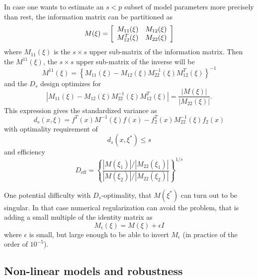 \documentclass[12pt]{iopart}
\begin{document}
In case one wants to estimate an $s < p$ subset of model parameters more precisely than rest, the information matrix can be partitioned as
\begin{equation}
M(\xi) = \left[
  \begin{array}{l l}
    M_{11}(\xi)   & M_{12}(\xi)\\
    M^T_{12}(\xi) & M_{22}(\xi)
  \end{array} \right]
\end{equation}
where $M_{11}(\xi)$ is the $s \times s$ upper sub-matrix of the information matrix. Then the $M^{11}(\xi)$, the $s \times s$ upper sub-matrix of the inverse will be
\begin{equation}
M^{11}(\xi) = \left\{M_{11}(\xi) - M_{12}(\xi)M^{-1}_{22}(\xi)M^T_{12}(\xi)\right\}^{-1}
\end{equation}
and the $D_s$ design optimizes for 
\begin{equation}
|M_{11}(\xi) - M_{12}(\xi)M^{-1}_{22}(\xi)M^T_{12}(\xi)| = \frac{|M(\xi)|}{|M_{22}(\xi)|}.
\end{equation}
This expression gives the standardized variance as
\begin{equation}
d_s(x, \xi) = f^T(x) M^{-1}(\xi)f(x) - f_2^T(x) M_{22}^{-1}(\xi)f_2(x)
\label{eq:dsvar}
\end{equation}
with optimality requirement of
\begin{equation}
d_s(x, \xi^*) \leq s
\end{equation}
and efficiency
\begin{equation}
D_\mathrm{eff} = \left\{\frac{|M(\xi_1)|/|M_{22}(\xi_1)|}{|M(\xi_2)|/|M_{22}(\xi_2)|}\right\}^{1/s}
\end{equation}

One potential difficulty with $D_s$-optimality, that $M(\xi^*)$ can turn out to be singular. In that case numerical regularization can avoid the problem, that is adding a small multiple of the identity matrix as
\begin{equation}
M_\epsilon(\xi) = M(\xi)  + \epsilon I
\end{equation}  
where $\epsilon$ is small, but large enough to be able to invert $M_\epsilon$ (in practice of the order of $10^{-5}$).

\subsection{Non-linear models and robustness}
\end{document}
